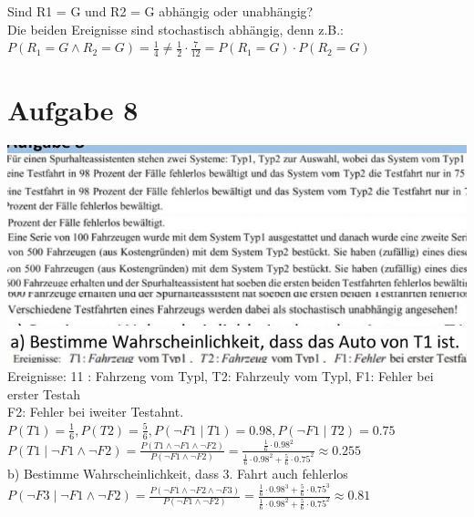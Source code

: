 \documentclass[10pt]{article}
\begin{document}
{Sind R1 = G und R2 = G abhängig oder unabhängig?\\
Die beiden Ereignisse sind stochastisch abhängig, denn z.B.:\\
$P\left(R_{1}=G \wedge R_{2}=G\right)=\frac{1}{4} \neq \frac{1}{2} \cdot \frac{7}{12}=P\left(R_{1}=G\right) \cdot P\left(R_{2}=G\right)$

\section*{Aufgabe 8}
\includegraphics[max width=\textwidth, center]{2024_12_29_0906b02acf849bda8665g-5(9)}\\
\includegraphics[max width=\textwidth, center]{2024_12_29_0906b02acf849bda8665g-5(8)}\\
\includegraphics[max width=\textwidth, center]{2024_12_29_0906b02acf849bda8665g-5(3)}\\
\includegraphics[max width=\textwidth, center]{2024_12_29_0906b02acf849bda8665g-5(6)}\\
\includegraphics[max width=\textwidth, center]{2024_12_29_0906b02acf849bda8665g-5(5)}\\
\includegraphics[max width=\textwidth]{2024_12_29_0906b02acf849bda8665g-5(1)} Ereignisse: 11 : Fahrzeng vom Typl, T2: Fahrzeuly vom Typl, F1: Fehler bei erster Testah\\
F2: Fehler bei iweiter Testahnt.\\
$P(T 1)=\frac{1}{6}, P(T 2)=\frac{5}{6}, P(\neg F 1 \mid T 1)=0.98, P(\neg F 1 \mid T 2)=0.75$\\
$P(T 1 \mid \neg F 1 \wedge \neg F 2)=\frac{P(T 1 \wedge \neg F 1 \wedge \neg F 2)}{P(\neg F 1 \wedge \neg F 2)}=\frac{\frac{1}{6} \cdot 0.98^{2}}{\frac{1}{6} \cdot 0.98^{2}+\frac{5}{6} \cdot 0.75^{2}} \approx 0.255$\\
b) Bestimme Wahrscheinlichkeit, dass 3. Fahrt auch fehlerlos\\
$P(\neg F 3 \mid \neg F 1 \wedge \neg F 2)=\frac{P(\neg F 1 \wedge \neg F 2 \wedge \neg F 3)}{P(\neg F 1 \wedge \neg F 2)}=\frac{\frac{1}{6} \cdot 0.98^{3}+\frac{5}{6} \cdot 0.75^{3}}{\frac{1}{6} \cdot 0.98^{2}+\frac{5}{6} \cdot 0.75^{2}} \approx 0.81$

}
\end{document}
